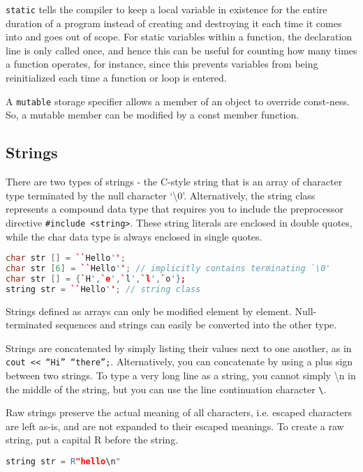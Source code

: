 \documentclass[10pt]{article}
\begin{document}
\texttt{static} tells the compiler to keep a local variable in existence for the entire duration of a program instead of creating and destroying it each time it comes into and goes out of scope. For static variables within a function, the declaration line is only called once, and hence this can be useful for counting how many times a function operates, for instance, since this prevents variables from being reinitialized each time a function or loop is entered.

A \texttt{mutable} storage specifier allows a member of an object to override const-ness. So, a mutable member can be modified by a const member function.

\subsection{Strings}

There are two types of strings - the C-style string that is an array of character type terminated by the null character `\textbackslash0'. Alternatively, the string class represents a compound data type that requires you to include the preprocessor directive \texttt{\#include <string>}. These string literals are enclosed in double quotes, while the char data type is always enclosed in single quotes. 

\begin{lstlisting}[language=C++]
char str [] = ``Hello''; 
char str [6] = ``Hello''; // implicitly contains terminating `\0'
char str [] = {`H',`e',`l',`l',`o'};
string str = ``Hello''; // string class
\end{lstlisting}

Strings defined as arrays can only be modified element by element. Null-terminated sequences and strings can easily be converted into the other type.

Strings are concatenated by simply listing their values next to one another, as in \texttt{cout << ``Hi'' ``there'';}. Alternatively, you can concatenate by using a plus sign between two strings. To type a very long line as a string, you cannot simply \textbackslash n in the middle of the string, but you can use the line continuation character \texttt{\textbackslash}.

Raw strings preserve the actual meaning of all characters, i.e. escaped characters are left as-is, and are not expanded to their escaped meanings. To create a raw string, put a capital R before the string.

\begin{lstlisting}[language=C++]
string str = R"hello\n"
\end{lstlisting}
\end{document}

